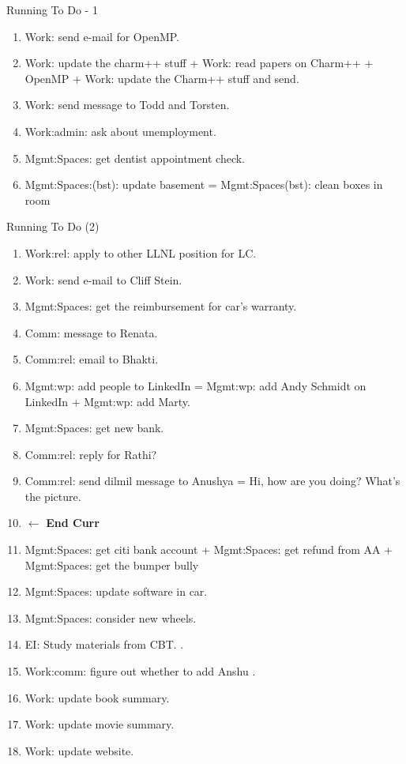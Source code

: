\begin{frame}{Running To Do - 1}
\begin{enumerate}
\item \tiny Work: send e-mail for OpenMP. 
\item \tiny Work: update the charm++ stuff + Work: read papers on 
 Charm++ + OpenMP + Work: update the Charm++ stuff and send. 
\item \tiny Work: send message to Todd and Torsten. 
\item \tiny Work:admin: ask about unemployment. 
\item \tiny Mgmt:Spaces: get dentist appointment check. 
\item \tiny Mgmt:Spaces:(bst): update basement =  Mgmt:Spaces(bst): clean boxes in room  
    \seti
\end{enumerate}
\end{frame}

\begin{frame}{Running To Do (2)} 
  \begin{enumerate}
    \conti
\item \tiny Work:rel: apply to other LLNL position for LC. 
  \dl{}
\item Work: send e-mail to Cliff Stein.
\item Mgmt:Spaces: get the reimbursement for car's warranty. 
\item Comm: message to Renata.
\item Comm:rel: email to Bhakti. 
\item \tiny Mgmt:wp: add people to LinkedIn =  Mgmt:wp: add
  Andy Schmidt on LinkedIn + Mgmt:wp: add Marty.
\item Mgmt:Spaces: get new bank. 
\item Comm:rel: reply for Rathi? 
\item \tiny Comm:rel: send dilmil message to Anushya = Hi, how are you doing? What's the picture. 
  \item[] \tiny  $\leftarrow$ \textbf{End Curr}
  \item \tiny Mgmt:Spaces: get citi bank account + Mgmt:Spaces: get refund from AA  + Mgmt:Spaces: get the bumper bully
   
  \item \tiny Mgmt:Spaces: update software in car. 
  \item \tiny  Mgmt:Spaces: consider new wheels. 
  \item \tiny EI: Study materials from CBT.   . 
  \item \tiny Work:comm: figure out whether to add Anshu .
  \item \tiny Work: update book summary. 
  \item \tiny Work: update movie summary.
  \item \tiny Work: update website.
    
  \end{enumerate}
\end{frame}


